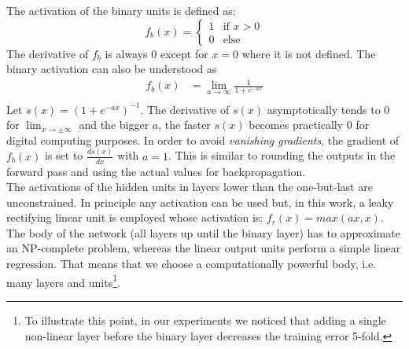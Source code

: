  The activation of the binary units is defined as: 
\begin{equation*}
f_b(x)=
\begin{cases}
1 & \text{if } x > 0\\
0 & \text{else}
\end{cases}
\end{equation*}
The derivative of $f_b$ is always $0$ except for $x = 0$ where it is not defined. 
The binary activation can also be understood as 
\begin{align*}
f_b(x) &= \lim_{a \rightarrow \infty} \frac{1}{1 + e^{-ax}}\\
\end{align*}
Let $s(x) = (1 + e^{-ax})^{-1}$.  The derivative of $s(x)$ asymptotically tends to $0$ for $\lim_{x \rightarrow \pm \infty}$ and the bigger $a$, the faster $s(x)$ becomes practically $0$ for digital computing purposes. In order to avoid \emph{vanishing gradients}, the gradient of $f_b(x)$ is set to $\frac{d s(x)}{dx}$ with $a = 1$. This is similar to rounding the outputs in the forward pass and using the actual values for backpropagation.\\
The activations of the hidden units in layers lower than the one-but-last are unconstrained. In principle any activation can be used but, in this work, a leaky rectifying linear unit is employed whose activation is: $f_r(x) = max(ax, x)$. The body of the network (all layers up until the binary layer) has to approximate an NP-complete problem, whereas the linear output units perform a simple linear regression. That means that we choose a computationally powerful body, i.e. many layers and units\footnote{To illustrate this point, in our experiments we noticed that adding a single non-linear layer before the binary layer decreases the training error 5-fold.}. 


